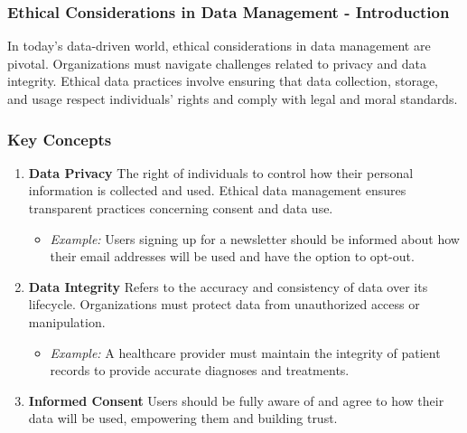 \documentclass[aspectratio=169]{beamer}
\begin{document}
\begin{frame}[fragile]
    \frametitle{Ethical Considerations in Data Management - Introduction}
    In today’s data-driven world, ethical considerations in data management are pivotal. Organizations must navigate challenges related to privacy and data integrity. Ethical data practices involve ensuring that data collection, storage, and usage respect individuals' rights and comply with legal and moral standards.
\end{frame}

\begin{frame}[fragile]
    \frametitle{Key Concepts}
    \begin{enumerate}
        \item \textbf{Data Privacy}  
        The right of individuals to control how their personal information is collected and used. Ethical data management ensures transparent practices concerning consent and data use.
        \begin{itemize}
            \item \textit{Example:} Users signing up for a newsletter should be informed about how their email addresses will be used and have the option to opt-out.
        \end{itemize}

        \item \textbf{Data Integrity}  
        Refers to the accuracy and consistency of data over its lifecycle. Organizations must protect data from unauthorized access or manipulation.
        \begin{itemize}
            \item \textit{Example:} A healthcare provider must maintain the integrity of patient records to provide accurate diagnoses and treatments.
        \end{itemize}

        \item \textbf{Informed Consent}  
        Users should be fully aware of and agree to how their data will be used, empowering them and building trust.
    \end{enumerate}
\end{frame}
\end{document}

